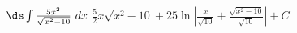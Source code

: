 {$\ds \int \frac {5x^2}{\sqrt{x^2-10}}\ dx$
}
{$\frac52x\sqrt{x^2-10}+25\ln\left|\frac{x}{\sqrt{10}}+\frac{\sqrt{x^2-10}}{\sqrt{10}}\right|+C$
}